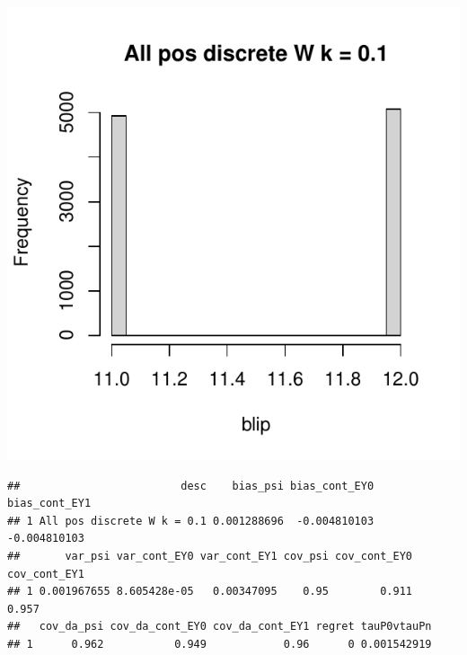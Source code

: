 \documentclass[11pt]{article}\usepackage[]{graphicx}\usepackage[table]{xcolor}
\makeatletter
\def\maxwidth{ %
  \ifdim\Gin@nat@width>\linewidth
    \linewidth
  \else
    \Gin@nat@width
  \fi
}
\newenvironment{kframe}{%
 \def\at@end@of@kframe{}%
 \ifinner\ifhmode%
  \def\at@end@of@kframe{\end{minipage}}%
  \begin{minipage}{\columnwidth}%
 \fi\fi%
 \def\FrameCommand##1{\hskip\@totalleftmargin \hskip-\fboxsep
 \colorbox{shadecolor}{##1}\hskip-\fboxsep
     \hskip-\linewidth \hskip-\@totalleftmargin \hskip\columnwidth}%
 \MakeFramed {\advance\hsize-\width
   \@totalleftmargin\z@ \linewidth\hsize
   \@setminipage}}%
 {\par\unskip\endMakeFramed%
 \at@end@of@kframe}
\newenvironment{knitrout}{}{} %
\makeatother
\begin{document}










\begin{knitrout}
\color{fgcolor}
\includegraphics[width=\maxwidth]{figure/unnamed-chunk-4-1} 
\begin{kframe}\begin{verbatim}
##                         desc    bias_psi bias_cont_EY0 bias_cont_EY1
## 1 All pos discrete W k = 0.1 0.001288696  -0.004810103  -0.004810103
##       var_psi var_cont_EY0 var_cont_EY1 cov_psi cov_cont_EY0 cov_cont_EY1
## 1 0.001967655 8.605428e-05   0.00347095    0.95        0.911        0.957
##   cov_da_psi cov_da_cont_EY0 cov_da_cont_EY1 regret tauP0vtauPn
## 1      0.962           0.949            0.96      0 0.001542919
\end{verbatim}
\end{kframe}

\end{knitrout}
\end{document}
